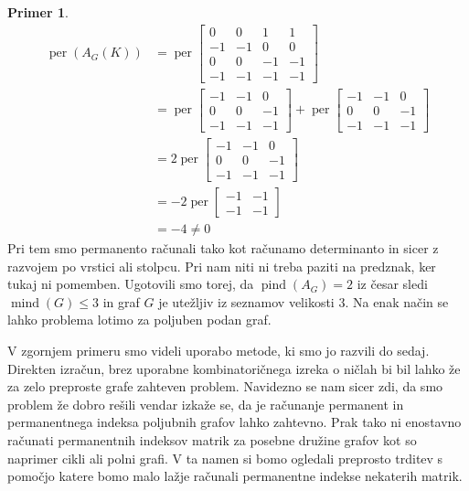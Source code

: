 \documentclass[12pt,a4paper,twoside]{article}
\theoremstyle{definition} %
\newtheorem{primer}[definicija]{Primer}
\theoremstyle{plain} %
\numberwithin{equation}{section}  %
\DeclareMathOperator{\per}{per}
\DeclareMathOperator{\mind}{mind}
\DeclareMathOperator{\pind}{pind}
\begin{document}
\begin{primer}
\begin{equation*}
\begin{split}
\per(A_G(K)) &= \per \left[ \begin{matrix} 0 & 0 & 1 & 1 \\ -1 & -1 & 0 & 0 \\ 0 & 0 & -1 & -1 \\ -1 & -1 & -1 & -1 \end{matrix} \right] \\
&=\per \left[ \begin{matrix} -1 & -1 & 0 \\ 0 & 0 & -1 \\ -1 & -1 & -1 \end{matrix} \right] + \per \left[ \begin{matrix} -1 & -1 & 0 \\ 0 & 0 & -1 \\ -1 & -1 & -1 \end{matrix} \right] \\
&= 2 \per\left[ \begin{matrix} -1 & -1 & 0 \\ 0 & 0 & -1 \\ -1 & -1 & -1 \end{matrix} \right] \\
& =-2 \per \left[ \begin{matrix} -1 & -1 \\ -1 & -1 \end{matrix} \right] \\
&=-4 \neq 0
\end{split}
\end{equation*}
Pri tem smo permanento računali tako kot računamo determinanto in sicer z razvojem po vrstici ali stolpcu. Pri nam niti ni treba paziti na predznak, ker tukaj ni pomemben. Ugotovili smo torej, da $\pind(A_G) = 2$ iz česar sledi $\mind(G) \le 3$ in graf $G$ je utežljiv iz seznamov velikosti $3$. Na enak način se lahko problema lotimo za poljuben podan graf.
\end{primer}
V zgornjem primeru smo videli uporabo metode, ki smo jo razvili do sedaj. Direkten izračun, brez uporabne kombinatoričnega izreka o ničlah bi bil lahko že za zelo preproste grafe zahteven problem. Navidezno se nam sicer zdi, da smo problem že dobro rešili vendar izkaže se, da je računanje permanent in permanentnega indeksa poljubnih grafov lahko zahtevno. Prak tako ni enostavno računati permanentnih indeksov matrik za posebne družine grafov kot so naprimer cikli ali polni grafi. V ta namen si bomo ogledali preprosto trditev s pomočjo katere bomo malo lažje računali permanentne indekse nekaterih matrik.
\end{document}
